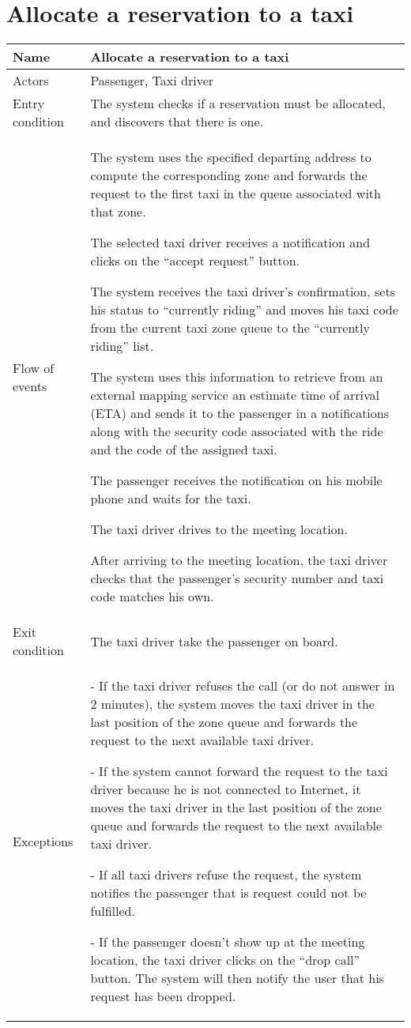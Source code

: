 \section{Allocate a reservation to a taxi}
\begin{center}
\begin{longtable}{|l| p{9cm}|}
\hline
Name &
Allocate a reservation to a taxi \\
\hline
Actors &
Passenger, Taxi driver \\
\hline
Entry condition & 
The system checks if a reservation must be allocated, and discovers that there is one. \\
\hline
Flow of events & 
The system uses the specified departing address to compute the corresponding zone and forwards the request to the first taxi in the queue associated with that zone.

The selected taxi driver receives a notification
and clicks on the “accept request” button.

The system receives the taxi driver's confirmation, sets his status to “currently riding” and moves his taxi code from the current taxi zone queue to the “currently riding” list.

The system uses this information to retrieve from an external mapping service an estimate time of arrival (ETA) and sends it to the passenger in a notifications along with the security code associated with the ride and the code of the assigned taxi.

The passenger receives the notification on his mobile phone and waits for the taxi.

The taxi driver drives to the meeting location.

After arriving to the meeting location, the taxi driver checks that the passenger's security number and taxi code matches his own. \\
\hline
Exit condition &
The taxi driver take the passenger on board. \\
\hline
Exceptions &
- If the taxi driver refuses the call (or do not answer in 2 minutes), the system moves the taxi driver in the last position of the zone queue and forwards the request to the next available taxi driver.

- If the system cannot forward the request to the taxi driver because he is not connected to Internet, it moves the taxi driver in the last position of the zone queue and forwards the request to the next available taxi driver.

- If all taxi drivers refuse the request, the system notifies the passenger that is request could not be fulfilled.

- If the passenger doesn't show up at the meeting location, the taxi driver clicks on the “drop call” button. The system will then notify the user that his request has been dropped. \\
\hline
\end{longtable}
\end{center}


